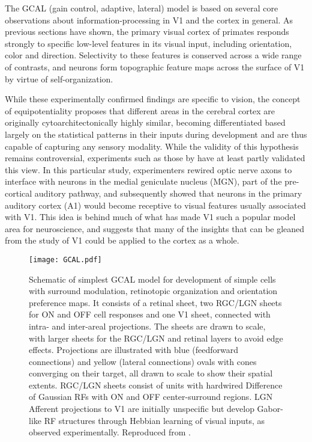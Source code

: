 The GCAL (gain control, adaptive, lateral) model is based on several
core observations about information-processing in V1 and the cortex in
general. As previous sections have shown, the primary visual cortex of
primates responds strongly to specific low-level features in its
visual input, including orientation, color and direction. Selectivity
to these features is conserved across a wide range of contrasts, and
neurons form topographic feature maps across the surface of V1 by
virtue of self-organization.

While these experimentally confirmed findings are specific to vision,
the concept of equipotentiality proposes that different areas in the
cerebral cortex are originally cytoarchitectonically highly similar,
becoming differentiated based largely on the statistical patterns in
their inputs during development and are thus capable of capturing any
sensory modality. While the validity of this hypothesis remains
controversial, experiments such as those by \cite{Sur1990} have at
least partly validated this view. In this particular study,
experimenters rewired optic nerve axons to interface with neurons in
the medial geniculate nucleus (MGN), part of the pre-cortical auditory
pathway, and subsequently showed that neurons in the primary auditory
cortex (A1) would become receptive to visual features usually
associated with V1. This idea is behind much of what has made V1 such
a popular model area for neuroscience, and suggests that many of the
insights that can be gleaned from the study of V1 could be applied to
the cortex as a whole.

\begin{figure}
	\centering \texttt{[image: GCAL.pdf]}
	\caption[Schematic representation of the GCAL model. Reproduced
      from \cite{Stevens2013}.]{Schematic of simplest GCAL model for
      development of simple cells with surround modulation,
      retinotopic organization and orientation preference maps. It
      consists of a retinal sheet, two RGC/LGN sheets for ON and OFF cell
      responses and one V1 sheet, connected with intra- and
      inter-areal projections. The sheets are drawn to scale, with
      larger sheets for the RGC/LGN and retinal layers to avoid edge
      effects. Projections are illustrated with blue (feedforward
      connections) and yellow (lateral connections) ovals with cones
      converging on their target, all drawn to scale to show their
      spatial extents. RGC/LGN sheets consist of units with hardwired
      Difference of Gaussian RFs with ON and OFF center-surround
      regions. LGN Afferent projections to V1 are initially unspecific
      but develop Gabor-like RF structures through Hebbian learning of
      visual inputs, as observed experimentally. Reproduced from
      \cite{Stevens2013}.}
	\label{GCAL}
\end{figure}

